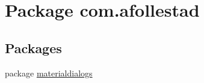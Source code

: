 \hypertarget{namespacecom_1_1afollestad}{}\section{Package com.\+afollestad}
\label{namespacecom_1_1afollestad}
\subsection*{Packages}
\begin{DoxyCompactItemize}
\item 
package \hyperlink{namespacecom_1_1afollestad_1_1materialdialogs}{materialdialogs}
\end{DoxyCompactItemize}
